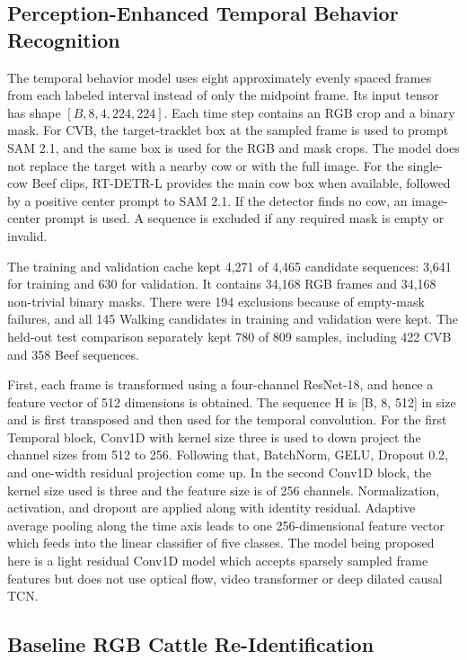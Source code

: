 \subsection{Perception-Enhanced Temporal Behavior Recognition}

The temporal behavior model uses eight approximately evenly spaced frames from each labeled interval instead of only the midpoint frame. Its input tensor has shape $[B,8,4,224,224]$. Each time step contains an RGB crop and a binary mask. For CVB, the target-tracklet box at the sampled frame is used to prompt SAM 2.1, and the same box is used for the RGB and mask crops. The model does not replace the target with a nearby cow or with the full image. For the single-cow Beef clips, RT-DETR-L provides the main cow box when available, followed by a positive center prompt to SAM 2.1. If the detector finds no cow, an image-center prompt is used. A sequence is excluded if any required mask is empty or invalid.

The training and validation cache kept 4,271 of 4,465 candidate sequences: 3,641 for training and 630 for validation. It contains 34,168 RGB frames and 34,168 non-trivial binary masks. There were 194 exclusions because of empty-mask failures, and all 145 Walking candidates in training and validation were kept. The held-out test comparison separately kept 780 of 809 samples, including 422 CVB and 358 Beef sequences.

First, each frame is transformed using a four-channel ResNet-18, and hence a feature vector of 512 dimensions is obtained. The sequence H is [B, 8, 512] in size and is first transposed and then used for the temporal convolution. For the first Temporal block, Conv1D with kernel size three is used to down project the channel sizes from 512 to 256. Following that, BatchNorm, GELU, Dropout 0.2, and one-width residual projection come up. In the second Conv1D block, the kernel size used is three and the feature size is of 256 channels. Normalization, activation, and dropout are applied along with identity residual. Adaptive average pooling along the time axis leads to one 256-dimensional feature vector which feeds into the linear classifier of five classes. The model being proposed here is a light residual Conv1D model which accepts sparsely sampled frame features but does not use optical flow, video transformer or deep dilated causal TCN.

\subsection{Baseline RGB Cattle Re-Identification}

